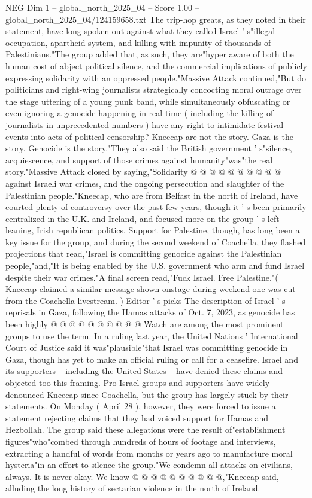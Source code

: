 \begin{textsample}{NEG Dim 1 – global\_north\_2025\_04 – Score 1.00 – global\_north\_2025\_04/124159658.txt}  \label{ex:f1_neg_101}
The trip-hop greats, as they noted in their statement, have long spoken out against what they called Israel ' s"illegal occupation, apartheid system, and killing with impunity of thousands of Palestinians."The group added that, as such, they are"hyper aware of both the human cost of abject political silence, and the commercial implications of publicly expressing solidarity with an oppressed people."Massive Attack continued,"But do politicians and right-wing journalists strategically concocting moral outrage over the stage uttering of a young punk band, while simultaneously obfuscating or even ignoring a genocide happening in real time ( including the killing of journalists in unprecedented numbers ) have any right to intimidate festival events into acts of political censorship?
Kneecap are not the story.
Gaza is the story.
Genocide is the story."They also said the British government ' s"silence, acquiescence, and support of those crimes against humanity"was"the real story."Massive Attack closed by saying,"Solidarity @ @ @ @ @ @ @ @ @ @ against Israeli war crimes, and the ongoing persecution and slaughter of the Palestinian people."Kneecap, who are from Belfast in the north of Ireland, have courted plenty of controversy over the past few years, though it ' s been primarily centralized in the U.K. and Ireland, and focused more on the group ' s left-leaning, Irish republican politics.
Support for Palestine, though, has long been a key issue for the group, and during the second weekend of Coachella, they flashed projections that read,"Israel is committing genocide against the Palestinian people,"and,"It is being enabled by the U.S. government who arm and fund Israel despite their war crimes."A final screen read,"Fuck Israel.
Free Palestine."( Kneecap claimed a similar message shown onstage during weekend one was cut from the Coachella livestream. ) Editor ' s picks The description of Israel ' s reprisals in Gaza, following the Hamas attacks of Oct. 7, 2023, as genocide has been highly @ @ @ @ @ @ @ @ @ @ Watch are among the most prominent groups to use the term.
In a ruling last year, the United Nations ' International Court of Justice said it was"plausible"that Israel was committing genocide in Gaza, though has yet to make an official ruling or call for a ceasefire.
Israel and its supporters -- including the United States -- have denied these claims and objected too this framing.
Pro-Israel groups and supporters have widely denounced Kneecap since Coachella, but the group has largely stuck by their statements.
On Monday ( April 28 ), however, they were forced to issue a statement rejecting claims that they had voiced support for Hamas and Hezbollah.
The group said these allegations were the result of"establishment figures"who"combed through hundreds of hours of footage and interviews, extracting a handful of words from months or years ago to manufacture moral hysteria"in an effort to silence the group."We condemn all attacks on civilians, always.
It is never okay.
We know @ @ @ @ @ @ @ @ @ @,"Kneecap said, alluding the long history of sectarian violence in the north of Ireland.

\end{textsample}
